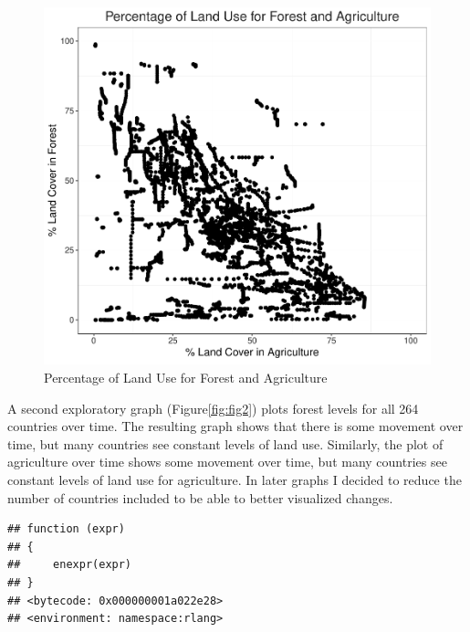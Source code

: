 \documentclass[12pt,]{article}
\begin{document}
\begin{figure}
\centering
\includegraphics{Marx_ENV872_Project_files/figure-latex/fig1-1.pdf}
\caption{\label{fig:fig1}Percentage of Land Use for Forest and
Agriculture}
\end{figure}

A second exploratory graph (Figure\ref{fig:fig2}) plots forest levels
for all 264 countries over time. The resulting graph shows that there is
some movement over time, but many countries see constant levels of land
use. Similarly, the plot of agriculture over time shows some movement
over time, but many countries see constant levels of land use for
agriculture. In later graphs I decided to reduce the number of countries
included to be able to better visualized changes.

\begin{verbatim}
## function (expr) 
## {
##     enexpr(expr)
## }
## <bytecode: 0x000000001a022e28>
## <environment: namespace:rlang>
\end{verbatim}
\end{document}
